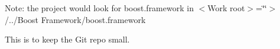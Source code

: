 Note\-: the project would look for boost.\-framework in $<$\-Work root$>$=\char`\"{}\char`\"{}$>$/../\-Boost Framework/boost.\-framework

This is to keep the Git repo small. 